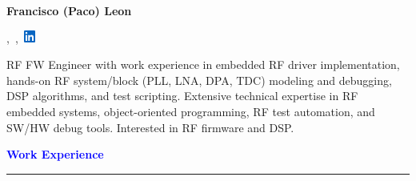 \documentclass[10pt, letterpaper]{letter}
\begin{document}

\vfill

\begin{center}

    \LARGE \textbf{Francisco (Paco) Leon}\vspace{8pt}\\
    \large

    \href{mailto:\myemail}{\myemail},\ \myphone,\
    \href{https://www.linkedin.com/in/francisco-leon-ab8178127/}
    {\includegraphics[width=11pt]{in.png}}\\
    \myaddress

\end{center}

\vfill


RF FW Engineer with work experience in embedded RF driver implementation, hands-on RF system/block (PLL, LNA, DPA, TDC) modeling and debugging, DSP algorithms, and test scripting. Extensive technical expertise in RF embedded systems, object-oriented programming, RF test automation, and SW/HW debug tools. Interested in RF firmware and DSP.

\vfill


\textcolor{Blue}{
    \large\textbf{Work Experience}
    \vspace{1pt} %
    \hrule height 1.5pt
}
\end{document}
